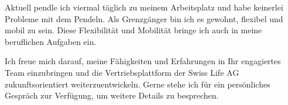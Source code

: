 \documentclass{ReCeiVe}         %
\begin{document}
\begin{cvletter}
Aktuell pendle ich viermal täglich zu meinem Arbeitsplatz und habe keinerlei Probleme mit dem Pendeln. Als Grenzgänger bin ich es gewohnt, flexibel und mobil zu sein. Diese Flexibilität und Mobilität bringe ich auch in meine beruflichen Aufgaben ein.\linebreak

Ich freue mich darauf, meine Fähigkeiten und Erfahrungen in Ihr engagiertes Team einzubringen und die Vertriebsplattform der Swiss Life AG zukunftsorientiert weiterzuentwickeln. Gerne stehe ich für ein persönliches Gespräch zur Verfügung, um weitere Details zu besprechen.\par\bigskip
\end{cvletter}

\makeletterclosing %
\end{document}
